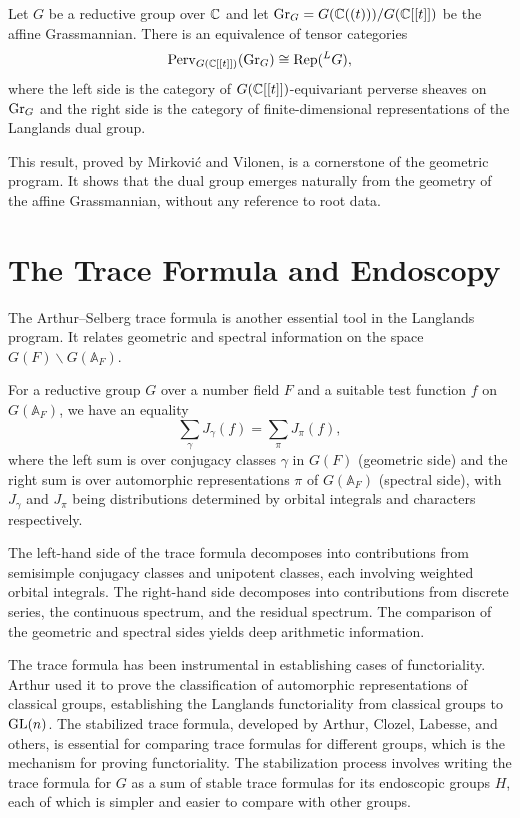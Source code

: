 \begin{theorem}
Let \(G\) be a reductive group over \(\mathbb{C}\) and let \(\operatorname{Gr}_G = G(\mathbb{C}((t)))/G(\mathbb{C}[[t]])\) be the affine Grassmannian. There is an equivalence of tensor categories
\[
\operatorname{Perv}_{G(\mathbb{C}[[t]])}(\operatorname{Gr}_G) \cong \operatorname{Rep}({}^L G),
\]
where the left side is the category of \(G(\mathbb{C}[[t]])\)-equivariant perverse sheaves on \(\operatorname{Gr}_G\) and the right side is the category of finite-dimensional representations of the Langlands dual group.
\end{theorem}

This result, proved by Mirkovi\'{c} and Vilonen, is a cornerstone of the geometric program. It shows that the dual group emerges naturally from the geometry of the affine Grassmannian, without any reference to root data.

\section{The Trace Formula and Endoscopy}

The Arthur--Selberg trace formula is another essential tool in the Langlands program. It relates geometric and spectral information on the space \(G(F)\backslash G(\mathbb{A}_F)\).

\begin{theorem}
For a reductive group \(G\) over a number field \(F\) and a suitable test function \(f\) on \(G(\mathbb{A}_F)\), we have an equality
\[
\sum_{\gamma} J_\gamma(f) = \sum_{\pi} J_\pi(f),
\]
where the left sum is over conjugacy classes \(\gamma\) in \(G(F)\) (geometric side) and the right sum is over automorphic representations \(\pi\) of \(G(\mathbb{A}_F)\) (spectral side), with \(J_\gamma\) and \(J_\pi\) being distributions determined by orbital integrals and characters respectively.
\end{theorem}

The left-hand side of the trace formula decomposes into contributions from semisimple conjugacy classes and unipotent classes, each involving weighted orbital integrals. The right-hand side decomposes into contributions from discrete series, the continuous spectrum, and the residual spectrum. The comparison of the geometric and spectral sides yields deep arithmetic information.

The trace formula has been instrumental in establishing cases of functoriality. Arthur used it to prove the classification of automorphic representations of classical groups, establishing the Langlands functoriality from classical groups to \(\operatorname{GL}(n)\). The stabilized trace formula, developed by Arthur, Clozel, Labesse, and others, is essential for comparing trace formulas for different groups, which is the mechanism for proving functoriality. The stabilization process involves writing the trace formula for \(G\) as a sum of stable trace formulas for its endoscopic groups \(H\), each of which is simpler and easier to compare with other groups.

